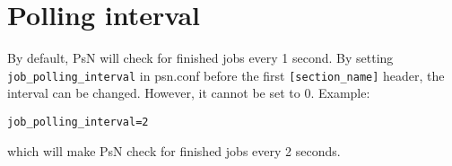 \section{Polling interval}
By default, PsN will check for finished jobs every 1 second.
By setting \verb|job_polling_interval| in psn.conf before the first \verb|[section_name]| header, the interval can be changed.
However, it cannot be set to 0.
Example:
\begin{verbatim}
job_polling_interval=2
\end{verbatim}
which will make PsN check for finished jobs every 2 seconds.



